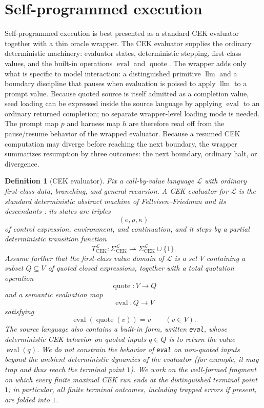 \documentclass[11pt]{article}
\newtheorem{definition}{Definition}[section]
\newcommand{\eval}{\operatorname{eval}}
\newcommand{\quoteop}{\operatorname{quote}}
\newcommand{\llm}{\operatorname{llm}}
\begin{document}
\section{Self-programmed execution}

Self-programmed execution is best presented as a standard CEK evaluator together with a thin oracle wrapper. The CEK evaluator supplies the ordinary deterministic machinery: evaluator states, deterministic stepping, first-class values, and the built-in operations $\eval$ and $\quoteop$. The wrapper adds only what is specific to model interaction: a distinguished primitive $\llm$ and a boundary discipline that pauses when evaluation is poised to apply $\llm$ to a prompt value. Because quoted source is itself admitted as a completion value, seed loading can be expressed inside the source language by applying $\eval$ to an ordinary returned completion; no separate wrapper-level loading mode is needed. The prompt map $p$ and harness map $h$ are therefore read off from the pause/resume behavior of the wrapped evaluator. Because a resumed CEK computation may diverge before reaching the next boundary, the wrapper summarizes resumption by three outcomes: the next boundary, ordinary halt, or divergence.

\begin{definition}[CEK evaluator]\label{def:cek}
Fix a call-by-value language $\mathcal{L}$ with ordinary first-class data, branching, and general recursion. A \emph{CEK evaluator} for $\mathcal{L}$ is the standard deterministic abstract machine of Felleisen--Friedman and its descendants \cite{FelleisenFriedman86,AgerEtAl03}: its states are triples
\[
(e,\rho,\kappa)
\]
of control expression, environment, and continuation, and it steps by a partial deterministic transition function
\[
T_{\mathrm{CEK}}^{\mathcal{L}}: \Sigma_{\mathrm{CEK}}^{\mathcal{L}} \rightharpoonup \Sigma_{\mathrm{CEK}}^{\mathcal{L}}\cup\{1\}.
\]
Assume further that the first-class value domain of $\mathcal{L}$ is a set $V$ containing a subset $Q\subseteq V$ of quoted closed expressions, together with a total quotation operation
\[
\quoteop:V\to Q
\]
and a semantic evaluation map
\[
\eval:Q\to V
\]
satisfying
\[
\eval(\quoteop(v))=v
\qquad (v\in V).
\]
The source language also contains a built-in form, written \texttt{eval}, whose deterministic CEK behavior on quoted inputs $q\in Q$ is to return the value $\eval(q)$. We do not constrain the behavior of \texttt{eval} on non-quoted inputs beyond the ambient deterministic dynamics of the evaluator (for example, it may trap and thus reach the terminal point $1$). We work on the well-formed fragment on which every finite maximal CEK run ends at the distinguished terminal point $1$; in particular, all finite terminal outcomes, including trapped errors if present, are folded into $1$.
\end{definition}
\end{document}
